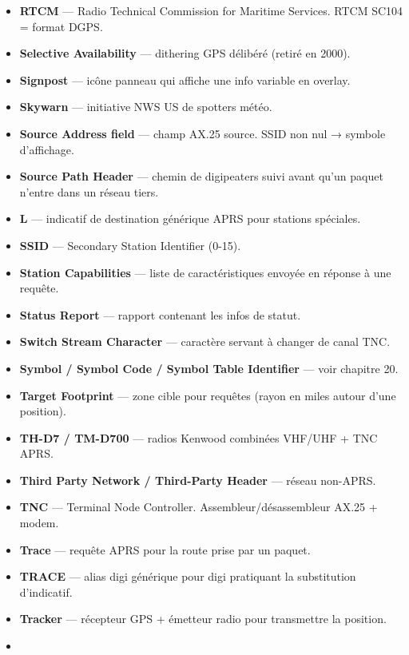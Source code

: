 {\begin{itemize}
  \textbf{RELAY} --- alias digi APRS générique pour digi VHF/UHF
  couverture locale limitée.
\item
  \textbf{RTCM} --- Radio Technical Commission for Maritime Services.
  RTCM SC104 = format DGPS.
\item
  \textbf{Selective Availability} --- dithering GPS délibéré (retiré en
  2000).
\item
  \textbf{Signpost} --- icône panneau qui affiche une info variable en
  overlay.
\item
  \textbf{Skywarn} --- initiative NWS US de spotters météo.
\item
  \textbf{Source Address field} --- champ AX.25 source. SSID non nul →
  symbole d'affichage.
\item
  \textbf{Source Path Header} --- chemin de digipeaters suivi avant
  qu'un paquet n'entre dans un réseau tiers.
\item
  \textbf{{\ttfamily {}L}} --- indicatif de destination générique APRS pour
  stations spéciales.
\item
  \textbf{SSID} --- Secondary Station Identifier (0-15).
\item
  \textbf{Station Capabilities} --- liste de caractéristiques envoyée en
  réponse à une requête.
\item
  \textbf{Status Report} --- rapport contenant les infos de statut.
\item
  \textbf{Switch Stream Character} --- caractère servant à changer de
  canal TNC.
\item
  \textbf{Symbol / Symbol Code / Symbol Table Identifier} --- voir
  chapitre 20.
\item
  \textbf{Target Footprint} --- zone cible pour requêtes (rayon en miles
  autour d'une position).
\item
  \textbf{TH-D7 / TM-D700} --- radios Kenwood combinées VHF/UHF + TNC
  APRS.
\item
  \textbf{Third Party Network / Third-Party Header} --- réseau non-APRS.
\item
  \textbf{TNC} --- Terminal Node Controller. Assembleur/désassembleur
  AX.25 + modem.
\item
  \textbf{Trace} --- requête APRS pour la route prise par un paquet.
\item
  \textbf{TRACE} --- alias digi générique pour digi pratiquant la
  substitution d'indicatif.
\item
  \textbf{Tracker} --- récepteur GPS + émetteur radio pour transmettre
  la position.
\item

\end{itemize}}
